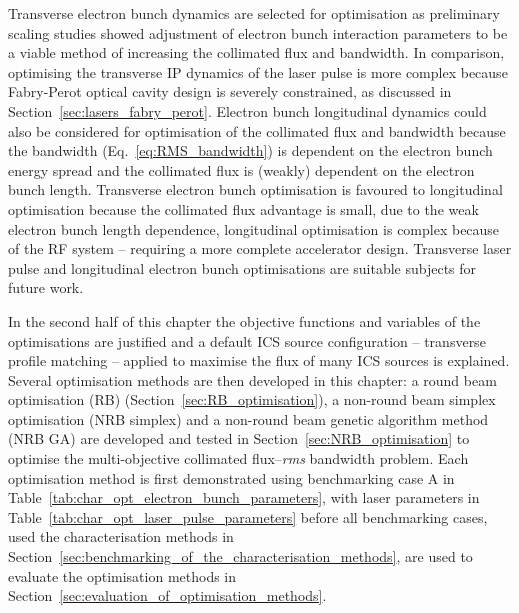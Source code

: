 \documentclass[../main.tex]{subfiles}
\begin{document}
Transverse electron bunch dynamics are selected for optimisation as preliminary scaling studies showed adjustment of electron bunch interaction parameters to be a viable method of increasing the collimated flux and bandwidth. In comparison, optimising the transverse IP dynamics of the laser pulse is more complex because Fabry-Perot optical cavity design is severely constrained, as discussed in Section~\ref{sec:lasers_fabry_perot}. Electron bunch longitudinal dynamics could also be considered for optimisation of the collimated flux and bandwidth because the bandwidth (Eq.~\ref{eq:RMS_bandwidth}) is dependent on the electron bunch energy spread and the collimated flux is (weakly) dependent on the electron bunch length. Transverse electron bunch optimisation is favoured to longitudinal optimisation because the collimated flux advantage is small, due to the weak electron bunch length dependence, longitudinal optimisation is complex because of the RF system -- requiring a more complete accelerator design. Transverse laser pulse and longitudinal electron bunch optimisations are suitable subjects for future work.  

In the second half of this chapter the objective functions and variables of the optimisations are justified and a default ICS source configuration -- transverse profile matching -- applied to maximise the flux of many ICS sources is explained. Several optimisation methods are then developed in this chapter: a round beam optimisation (RB) (Section~\ref{sec:RB_optimisation}), a non-round beam simplex optimisation (NRB simplex) and a non-round beam genetic algorithm method (NRB GA) are developed and tested in Section~\ref{sec:NRB_optimisation} to optimise the multi-objective collimated flux--\textit{rms} bandwidth problem. Each optimisation method is first demonstrated using benchmarking case A in Table~\ref{tab:char_opt_electron_bunch_parameters}, with laser parameters in Table~\ref{tab:char_opt_laser_pulse_parameters} before all benchmarking cases, used the characterisation methods in Section~\ref{sec:benchmarking_of_the_characterisation_methods}, are used to evaluate the optimisation methods in Section~\ref{sec:evaluation_of_optimisation_methods}.
\end{document}
